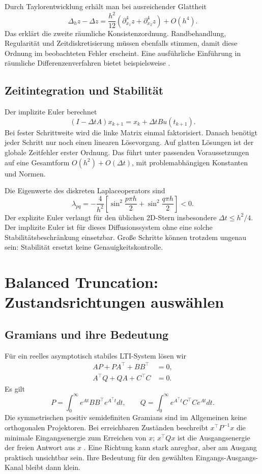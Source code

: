 \documentclass[11pt,a4paper]{article}
\begin{document}
Durch Taylorentwicklung erhält man bei ausreichender Glattheit
\begin{equation}
 \Delta_h z-\Delta z=\frac{h^2}{12}(\partial_{x_1}^4z+\partial_{x_2}^4z)+O(h^4).
\end{equation}
Das erklärt die zweite räumliche Konsistenzordnung. Randbehandlung, Regularität und Zeitdiskretisierung müssen ebenfalls stimmen, damit diese Ordnung im beobachteten Fehler erscheint. Eine ausführliche Einführung in räumliche Differenzenverfahren bietet beispielsweise \cite{kochmann}.

\subsection{Zeitintegration und Stabilität}
Der implizite Euler berechnet
\begin{equation}\label{eq:euler}
 (I-\Delta t A)x_{k+1}=x_k+\Delta t B u(t_{k+1}).
\end{equation}
Bei fester Schrittweite wird die linke Matrix einmal faktorisiert. Danach benötigt jeder Schritt nur noch einen linearen Lösevorgang. Auf glatten Lösungen ist der globale Zeitfehler erster Ordnung. Das führt unter passenden Voraussetzungen auf eine Gesamtform $O(h^2)+O(\Delta t)$, mit problemabhängigen Konstanten und Normen.

Die Eigenwerte des diskreten Laplaceoperators sind
\begin{equation}
 \lambda_{pq}=-\frac4{h^2}\left[\sin^2\!\frac{p\pi h}{2}+\sin^2\!\frac{q\pi h}{2}\right]<0.
\end{equation}
Der explizite Euler verlangt für den üblichen 2D-Stern insbesondere $\Delta t\le h^2/4$. Der implizite Euler ist für dieses Diffusionssystem ohne eine solche Stabilitätsbeschränkung einsetzbar. Große Schritte können trotzdem ungenau sein: Stabilität ersetzt keine Genauigkeitskontrolle.

\section{Balanced Truncation: Zustandsrichtungen auswählen}
\subsection{Gramians und ihre Bedeutung}
Für ein reelles asymptotisch stabiles LTI-System lösen wir
\begin{align}
 AP+PA^\top+BB^\top&=0,\\
 A^\top Q+QA+C^\top C&=0.
\end{align}
Es gilt
\begin{equation}
 P=\int_0^\infty e^{At}BB^\top e^{A^\top t}dt,\qquad
 Q=\int_0^\infty e^{A^\top t}C^\top Ce^{At}dt.
\end{equation}
Die symmetrischen positiv semidefiniten Gramians sind im Allgemeinen keine orthogonalen Projektoren. Bei erreichbaren Zuständen beschreibt $x^\top P^{-1}x$ die minimale Eingangsenergie zum Erreichen von $x$; $x^\top Qx$ ist die Ausgangsenergie der freien Antwort aus $x$ \cite{energy}. Eine Richtung kann stark anregbar, aber am Ausgang praktisch unsichtbar sein. Ihre Bedeutung für den gewählten Eingangs-Ausgangs-Kanal bleibt dann klein.
\end{document}
